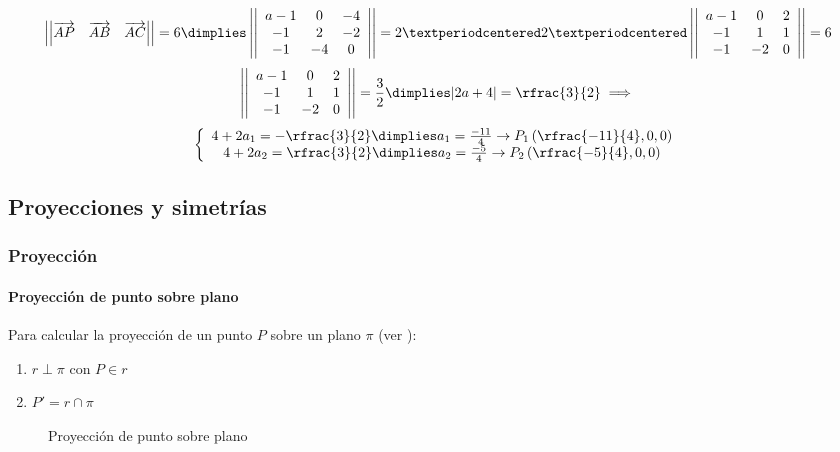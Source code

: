 \begin{problem}[Junio 2019]
\[
\left|\left|\vec{AP}\quad\vec{AB}\quad\vec{AC}\right|\right| = 6 \dimplies
\left|\left|\begin{array}{ccc}
a-1 & 0 & -4\\
-1 & 2 & -2\\
-1 & -4& 0
\end{array}\right|\right| = 2·2·\left|\left|\begin{array}{ccc}
a-1 & 0 & 2\\
-1 & 1 & 1\\
-1 & -2& 0
\end{array}\right|\right| = {6} 
\]
\[
 \left|\left|\begin{array}{ccc}
a-1 & 0 & 2\\
-1 & 1 & 1\\
-1 & -2& 0
\end{array}\right|\right| = \frac{3}{2}  \dimplies |2a+4| = \rfrac{3}{2} \implies\]
\[
\left\{\begin{array}{c}
4+2a_1 = -\rfrac{3}{2} \dimplies a_1 = \frac{-11}{4} \to P_1\left(\rfrac{-11}{4},0,0\right)\\
4+2a_2 = \rfrac{3}{2} \dimplies a_2 = \frac{-5}{4} \to P_2\left(\rfrac{-5}{4},0,0\right)
\end{array}\right.
\]

\end{problem}


\subsection{Proyecciones y simetrías}

\subsubsection{Proyección}

\paragraph{Proyección de punto sobre plano}

Para calcular la proyección de un punto $P$ sobre un plano $\pi$ (ver ):
\begin{enumerate}
  \item $r\perp \pi$ con $P\in r$
  \item $P' = r\cap \pi$
\end{enumerate}

\begin{figure}[H]
\centering
{}

\caption{Proyección de punto sobre plano}
\label{fig::proy::punto-plano}
\end{figure}


